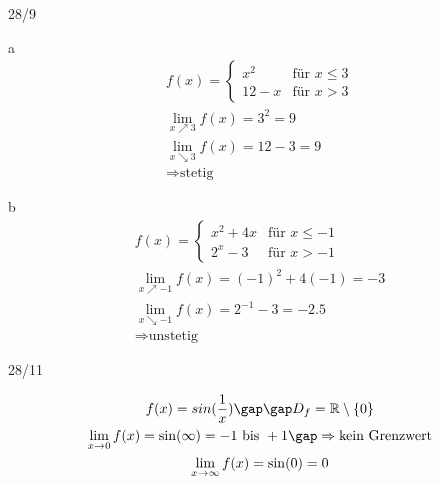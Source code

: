 \newpage
\begin{exercise}{28/9}
  \item [a]
  \begin{gather*}
    f(x) = \begin{cases}
      x^2 & \text{für } x \leq 3 \\
      12 - x & \text{für } x > 3
    \end{cases} \\
    \lim\limits_{x \nearrow 3} f(x) = 3^2 = 9 \\
    \lim\limits_{x \searrow 3} f(x) = 12 - 3 = 9 \\
    \Rightarrow \text{stetig}
  \end{gather*}
  \item [b]
  \begin{gather*}
    f(x) = \begin{cases}
      x^2 + 4x & \text{für } x \leq -1 \\
      2^x - 3 & \text{für } x > -1
    \end{cases} \\
    \lim\limits_{x \nearrow -1} f(x) = (-1)^2 + 4(-1) = -3 \\
    \lim\limits_{x \searrow -1} f(x) = 2^{-1} - 3 = -2.5 \\
    \Rightarrow \text{unstetig}
  \end{gather*}
\end{exercise}
\begin{exercise}{28/11}
  \item
  \begin{gather*}
    f(x) = sin(\frac{1}{x}) \gap\gap D_f = \mathbb{R} \setminus \{0\} \\
    \lim\limits_{x \to 0} f(x) = \sin(\infty) = -1 \text{ bis } +1 \gap\Rightarrow \text{kein Grenzwert} \\
    \lim\limits_{x \to \infty} f(x) = \sin(0) = 0
  \end{gather*}
\end{exercise}
